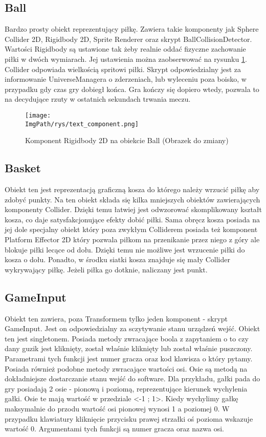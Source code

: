 \documentclass[a4paper,12pt,twoside,openany]{report}
\newcommand{\ImgPath}{.}
\begin{document}
\subsection{Ball}
\label{ball}
Bardzo prosty obiekt reprezentujący piłkę. Zawiera takie komponenty jak Sphere Collider 2D, Rigidbody 2D, Sprite Renderer oraz skrypt BallCollisionDetector. Wartości Rigidbody są ustawione tak żeby realnie oddać fizyczne zachowanie piłki w dwóch wymiarach. Jej ustawienia można zaobserwować na rysunku \ref{rigidbody_ball}. Collider odpowiada wielkością spritowi piłki. Skrypt odpowiedzialny jest za informowanie UniverseManagera o zderzeniach, lub wyleceniu poza boisko, w przypadku gdy czas gry dobiegł końca. Gra kończy się dopiero wtedy, pozwala to na decydujące rzuty w ostatnich sekundach trwania meczu.

\begin{figure}[H]
	\begin{center}
\centering
\texttt{[image: \\ImgPath/rys/text\_component.png]}
\end{center}
	\caption{Komponent Rigidbody 2D na obiekcie Ball (Obrazek do zmiany)}
	\label{rigidbody_ball}
\end{figure}

\subsection{Basket}
\label{basket}

Obiekt ten jest reprezentacją graficzną kosza do którego należy wrzucić piłkę aby zdobyć punkty. Na ten obiekt składa się kilka mniejszych obiektów zawierających komponenty Collider. Dzięki temu łatwiej jest odwzorować skomplikowany kształt kosza, co daje satysfakcjonujące efekty dobić piłki. Sama obręcz kosza posiada na jej dole specjalny obiekt który poza zwykłym Colliderem posiada też komponent Platform Effector 2D który pozwala piłkom na przenikanie przez niego z góry ale blokuje piłki lecące od dołu. Dzięki temu nie możliwe jest wrzucenie piłki do kosza o dołu. Ponadto, w środku siatki kosza znajduje się mały Collider wykrywający piłkę. Jeżeli piłka go dotknie, naliczany jest punkt.

\subsection{GameInput}
\label{gameinput}
Obiekt ten zawiera, poza Transformem tylko jeden komponent - skrypt GameInput. Jest on odpowiedzialny za sczytywanie stanu urządzeń wejść. Obiekt ten jest singletonem. Posiada metody zwracające boola z zapytaniem o to czy dany guzik jest kliknięty, został właśnie kliknięty lub został właśnie puszczony. Parametrami tych funkcji jest numer gracza oraz kod klawisza o który pytamy. Posiada również podobne metody zwracające wartości osi. Osie są metodą na dokładniejsze dostarczanie stanu wejść do software. Dla przykładu, gałki pada do gry posiadają 2 osie - pionową i poziomą, reprezentujące kierunek wychylenia gałki. Osie te mają wartość w przedziale <-1 ; 1>. Kiedy wychylimy gałkę maksymalnie do przodu wartość osi pionowej wynosi 1 a poziomej 0. W przypadku klawiatury kliknięcie przycisku prawej strzałki oś pozioma wskazuje wartość 0. Argumentami tych funkcji są numer gracza oraz nazwa osi. 
\end{document}
